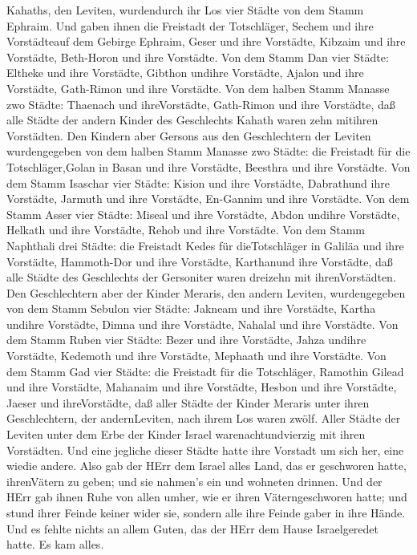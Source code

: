 Kahaths, den Leviten, wurdendurch ihr Los vier Städte von dem Stamm
Ephraim.  Und gaben ihnen die Freistadt der Totschläger,
Sechem und ihre Vorstädteauf dem Gebirge Ephraim, Geser und ihre
Vorstädte,  Kibzaim und ihre Vorstädte, Beth-Horon und ihre
Vorstädte.  Von dem Stamm Dan vier Städte: Eltheke und ihre
Vorstädte, Gibthon undihre Vorstädte,  Ajalon und ihre
Vorstädte, Gath-Rimon und ihre Vorstädte.  Von dem halben
Stamm Manasse zwo Städte: Thaenach und ihreVorstädte, Gath-Rimon und
ihre Vorstädte,  daß alle Städte der andern Kinder des
Geschlechts Kahath waren zehn mitihren Vorstädten.  Den
Kindern aber Gersons aus den Geschlechtern der Leviten wurdengegeben von
dem halben Stamm Manasse zwo Städte: die Freistadt für die
Totschläger,Golan in Basan und ihre Vorstädte, Beesthra und ihre
Vorstädte.  Von dem Stamm Isaschar vier Städte: Kision und
ihre Vorstädte, Dabrathund ihre Vorstädte,  Jarmuth und
ihre Vorstädte, En-Gannim und ihre Vorstädte.  Von dem
Stamm Asser vier Städte: Miseal und ihre Vorstädte, Abdon undihre
Vorstädte,  Helkath und ihre Vorstädte, Rehob und ihre
Vorstädte.  Von dem Stamm Naphthali drei Städte: die
Freistadt Kedes für dieTotschläger in Galiläa und ihre Vorstädte,
Hammoth-Dor und ihre Vorstädte, Karthanund ihre Vorstädte, 
daß alle Städte des Geschlechts der Gersoniter waren dreizehn mit
ihrenVorstädten.  Den Geschlechtern aber der Kinder
Meraris, den andern Leviten, wurdengegeben von dem Stamm Sebulon vier
Städte: Jakneam und ihre Vorstädte, Kartha undihre Vorstädte,
 Dimna und ihre Vorstädte, Nahalal und ihre Vorstädte.
 Von dem Stamm Ruben vier Städte: Bezer und ihre Vorstädte,
Jahza undihre Vorstädte,  Kedemoth und ihre Vorstädte,
Mephaath und ihre Vorstädte.  Von dem Stamm Gad vier
Städte: die Freistadt für die Totschläger, Ramothin Gilead und ihre
Vorstädte,  Mahanaim und ihre Vorstädte, Hesbon und ihre
Vorstädte, Jaeser und ihreVorstädte,  daß aller Städte der
Kinder Meraris unter ihren Geschlechtern, der andernLeviten, nach ihrem
Los waren zwölf.  Aller Städte der Leviten unter dem Erbe
der Kinder Israel warenachtundvierzig mit ihren Vorstädten.
 Und eine jegliche dieser Städte hatte ihre Vorstadt um
sich her, eine wiedie andere.  Also gab der HErr dem Israel
alles Land, das er geschworen hatte, ihrenVätern zu geben; und sie
nahmen's ein und wohneten drinnen.  Und der HErr gab ihnen
Ruhe von allen umher, wie er ihren Väterngeschworen hatte; und stund
ihrer Feinde keiner wider sie, sondern alle ihre Feinde gaber in ihre
Hände.  Und es fehlte nichts an allem Guten, das der HErr
dem Hause Israelgeredet hatte. Es kam alles.

